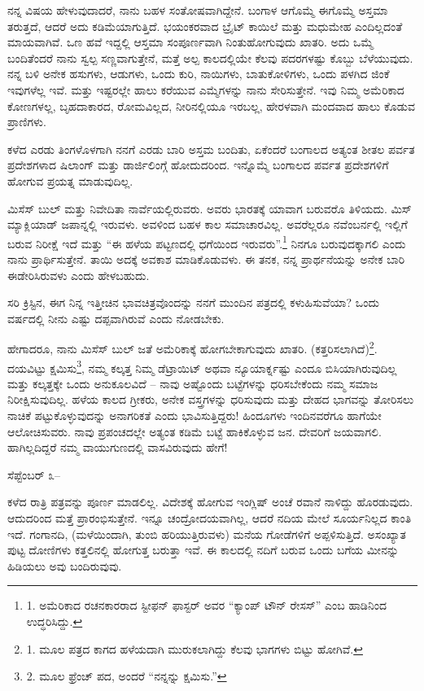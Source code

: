ನನ್ನ ವಿಷಯ ಹೇಳುವುದಾದರೆ, ನಾನು ಬಹಳ ಸಂತೋಷವಾಗಿದ್ದೇನೆ. ಬಂಗಾಳ ಆಗೊಮ್ಮೆ ಈಗೊಮ್ಮೆ ಅಸ್ತಮಾ ತರುತ್ತದೆ, ಆದರೆ ಅದು ಕಡಿಮೆಯಾಗುತ್ತಿದೆ. ಭಯಂಕರವಾದ ಬ್ರೈಟ್ ಕಾಯಿಲೆ ಮತ್ತು ಮಧುಮೇಹ ಎಂದಿಲ್ಲದಂತೆ ಮಾಯವಾಗಿವೆ. ಒಣ ಹವೆ ಇದ್ದಲ್ಲಿ ಆಸ್ತಮಾ ಸಂಪೂರ್ಣವಾಗಿ ನಿಂತುಹೋಗುವುದು ಖಾತರಿ. ಅದು ಒಮ್ಮೆ ಬಂದಿತೆಂದರೆ ನಾನು ಸ್ವಲ್ಪ ಸಣ್ಣವಾಗುತ್ತೇನೆ, ಮತ್ತೆ ಅಲ್ಪ ಕಾಲದಲ್ಲಿಯೇ ಕೆಲವು ಪದರಗಳಷ್ಟು ಕೊಬ್ಬು ಬೆಳೆಯುವುದು. ನನ್ನ ಬಳಿ ಅನೇಕ ಹಸುಗಳು, ಆಡುಗಳು, ಒಂದು ಕುರಿ, ನಾಯಿಗಳು, ಬಾತುಕೋಳಿಗಳು, ಒಂದು ಪಳಗಿದ ಜಿಂಕೆ ಇವುಗಳೆಲ್ಲ ಇವೆ. ಮತ್ತು ಇಷ್ಟರಲ್ಲೇ ಹಾಲು ಕರೆಯುವ ಎಮ್ಮೆಗಳನ್ನು ನಾನು ಸೇರಿಸುತ್ತೇನೆ. ಇವು ನಿಮ್ಮ ಅಮೆರಿಕಾದ ಕೋಣಗಳಲ್ಲ, ಬೃಹದಾಕಾರದ, ರೋಮವಿಲ್ಲದ, ನೀರಿ‌ನಲ್ಲಿಯೂ ಇರಬಲ್ಲ, ಹೇರಳವಾಗಿ ಮಂದವಾದ ಹಾಲು ಕೊಡುವ ಪ್ರಾಣಿಗಳು.

ಕಳೆದ ಎರಡು ತಿಂಗಳೊಳಗಾಗಿ ನನಗೆ ಎರಡು ಬಾರಿ ಅಸ್ತಮ ಬಂದಿತು, ಏಕೆಂದರೆ ಬಂಗಾಲದ ಅತ್ಯಂತ ಶೀತಲ ಪರ್ವತ ಪ್ರದೇಶಗಳಾದ ಷಿಲಾಂಗ್ ಮತ್ತು ಡಾರ್ಜಿಲಿಂಗ್ಗೆ ಹೋದುದರಿಂದ. ಇನ್ನೊಮ್ಮೆ ಬಂಗಾಲದ ಪರ್ವತ ಪ್ರದೇಶಗಳಿಗೆ ಹೋಗುವ ಪ್ರಯತ್ನ ಮಾಡುವುದಿಲ್ಲ.

ಮಿಸೆಸ್ ಬುಲ್ ಮತ್ತು ನಿವೇದಿತಾ ನಾರ್ವೆಯಲ್ಲಿರುವರು. ಅವರು ಭಾರತಕ್ಕೆ ಯಾವಾಗ ಬರುವರೊ ತಿಳಿಯದು. ಮಿಸ್ ಮ್ಯಾಕ್ಲಿಯಾಡ್ ಜಪಾನ್ನಲ್ಲಿ ಇರುವಳು. ಅವಳಿಂದ ಬಹಳ ಕಾಲ ಸಮಾಚಾರವಿಲ್ಲ. ಅವರೆಲ್ಲರೂ ನವೆಂಬರ್ನಲ್ಲಿ ಇಲ್ಲಿಗೆ ಬರುವ ನಿರೀಕ್ಷೆ ಇದೆ ಮತ್ತು “ಈ ಹಳೆಯ ಪಟ್ಟಣದಲ್ಲಿ ಧಗೆಯಿಂದ ಇರುವರು”.\footnote{1. ಅಮೆರಿಕಾದ ರಚನಕಾರರಾದ ಸ್ಟೀಫನ್ ಫಾಸ್ಟರ್ ಅವರ “ಕ್ಯಾಂಪ್ ಟೌನ್ ರೇಸಸ್” ಎಂಬ ಹಾಡಿನಿಂದ ಉದ್ಧರಿಸಿದ್ದು.} ನಿನಗೂ ಬರುವುದಕ್ಕಾಗಲಿ ಎಂದು ನಾನು ಪ್ರಾರ್ಥಿಸುತ್ತೇನೆ. ತಾಯಿ ಅದಕ್ಕೆ ಅವಕಾಶ ಮಾಡಿಕೊಡುವಳು. ಈ ತನಕ, ನನ್ನ ಪ್ರಾರ್ಥನೆಯನ್ನು ಅನೇಕ ಬಾರಿ ಈಡೇರಿಸಿರುವಳು ಎಂದು ಹೇಳಬಹುದು.

ಸರಿ ಕ್ರಿಸ್ಟಿನ, ಈಗ ನಿನ್ನ ಇತ್ತೀಚಿನ ಭಾವಚಿತ್ರವೊಂದನ್ನು ನನಗೆ ಮುಂದಿನ ಪತ್ರದಲ್ಲಿ ಕಳುಹಿಸುವೆಯಾ? ಒಂದು ವರ್ಷದಲ್ಲಿ ನೀನು ಎಷ್ಟು ದಪ್ಪವಾಗಿರುವೆ ಎಂದು ನೋಡಬೇಕು.

ಹೇಗಾದರೂ, ನಾನು ಮಿಸೆಸ್ ಬುಲ್ ಜತೆ ಅಮೆರಿಕಾಕ್ಕೆ ಹೋಗಬೇಕಾಗುವುದು ಖಾತರಿ. (ಕತ್ತರಿಸಲಾಗಿದೆ)\footnote{1. ಮೂಲ ಪತ್ರದ ಕಾಗದ ಹಳೆಯದಾಗಿ ಮುರುಕಲಾಗಿದ್ದು ಕೆಲವು ಭಾಗಗಳು ಬಿಟ್ಟು ಹೋಗಿವೆ.}. ದಯವಿಟ್ಟು ಕ್ಷಮಿಸು\footnote{2. ಮೂಲ ಫ್ರೆಂಚ್ ಪದ, ಅಂದರೆ “ನನ್ನನ್ನು ಕ್ಷಮಿಸು.”}, ನಮ್ಮ ಕಲ್ಕತ್ತ ನಿಮ್ಮ ಡೆಟ್ರಾಯಿಟ್ ಅಥವಾ ನ್ಯೂಯಾರ್ಕ್ನಷ್ಟು ಎಂದೂ ಬಿಸಿಯಾಗಿರುವುದಿಲ್ಲ ಮತ್ತು ಕಲ್ಕತ್ತಕ್ಕೇ ಒಂದು ಅನುಕೂಲವಿದೆ – ನಾವು ಅಷ್ಟೊಂದು ಬಟ್ಟೆಗಳನ್ನು ಧರಿಸಬೇಕೆಂದು ನಮ್ಮ ಸಮಾಜ ನಿರೀಕ್ಷಿಸುವುದಿಲ್ಲ. ಹಳೆಯ ಕಾಲದ ಗ್ರೀಕರು, ಅನೇಕ ವಸ್ತ್ರಗಳನ್ನು ಧರಿಸುವುದು ಮತ್ತು ದೇಹದ ಭಾಗವನ್ನು ತೋರಿಸಲು ನಾಚಿಕೆ ಪಟ್ಟುಕೊಳ್ಳುವುದನ್ನು ಅನಾಗರಿಕತೆ ಎಂದು ಭಾವಿಸುತ್ತಿದ್ದರು! ಹಿಂದೂಗಳು ಇಂದಿನವರೆಗೂ ಹಾಗೆಯೇ ಆಲೋಚಿಸುವರು. ನಾವು ಪ್ರಪಂಚದಲ್ಲೇ ಅತ್ಯಂತ ಕಡಿಮೆ ಬಟ್ಟೆ ಹಾಕಿಕೊಳ್ಳುವ ಜನ. ದೇವರಿಗೆ ಜಯವಾಗಲಿ. ಹಾಗಿಲ್ಲದಿದ್ದರೆ ನಮ್ಮ ವಾಯುಗುಣದಲ್ಲಿ ವಾಸವಿರುವುದು ಹೇಗೆ!

ಸೆಪ್ಟೆಂಬರ್ ೩–

ಕಳೆದ ರಾತ್ರಿ ಪತ್ರವನ್ನು ಪೂರ್ಣ ಮಾಡಲಿಲ್ಲ. ವಿದೇಶಕ್ಕೆ ಹೋಗುವ ಇಂಗ್ಲಿಷ್ ಅಂಚೆ ರವಾನೆ ನಾಳಿದ್ದು ಹೊರಡುವುದು. ಆದುದರಿಂದ ಮತ್ತೆ ಪ್ರಾರಂಭಿಸುತ್ತೇನೆ. ಇನ್ನೂ ಚಂದ್ರೋದಯವಾಗಿಲ್ಲ, ಆದರೆ ನದಿಯ ಮೇಲೆ ಸೂರ್ಯನಿಲ್ಲದ ಕಾಂತಿ ಇದೆ. ಗಂಗಾನದಿ, (ಮಳೆಯಿಂದಾಗಿ, ತುಂಬಿ ಹರಿಯುತ್ತಿರುವಳು) ಮನೆಯ ಗೋಡೆಗಳಿಗೆ ಅಪ್ಪಳಿಸುತ್ತಿದೆ. ಅಸಂಖ್ಯಾತ ಪುಟ್ಟ ದೋಣಿಗಳು ಕತ್ತಲಿನಲ್ಲಿ ಹೋಗುತ್ತ ಬರುತ್ತಾ ಇವೆ. ಈ ಕಾಲದಲ್ಲಿ ನದಿಗೆ ಬರುವ ಒಂದು ಬಗೆಯ ಮೀನನ್ನು ಹಿಡಿಯಲು ಅವು ಬಂದಿರುವುವು.

